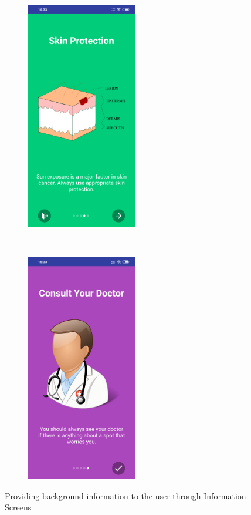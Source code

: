 \begin{figure}[t!]
\begin{subfigure}[t]{0.5\textwidth}
        \includegraphics[height=10cm]{figures/info3_android.png}
        \caption{}
    \end{subfigure}%
    ~
    \begin{subfigure}[t]{0.5\textwidth}
        \centering
        \includegraphics[height=10cm]{figures/info4_android.png}
        \caption{}
    \end{subfigure}
    \caption{Providing background information to the user through Information Screens}
    \label{fig:infoscreens}
\end{figure}

